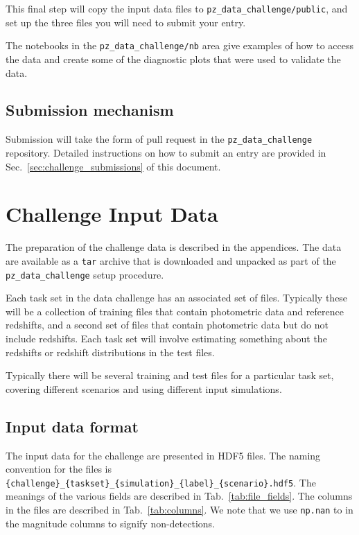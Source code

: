 \documentclass[11pt,twoside,letterpaper,onecolumn,english]{article}
\begin{document}
This final step will copy the input data files to
\texttt{pz\_data\_challenge/public}, and set up the three files you will
need to submit your entry.

The notebooks in the \texttt{pz\_data\_challenge/nb} area give examples
of how to access the data and create some of the diagnostic plots
that were used to validate the data.


\subsection{Submission mechanism}

Submission will take the form of pull request in the
\texttt{pz\_data\_challenge} repository.  Detailed instructions on how
to submit an entry are provided in
Sec.~\ref{sec:challenge_submissions} of this document.


\section{Challenge Input Data}
\label{sec:challenge_input_data}

The preparation of the challenge data is described in the appendices.
The data are available as a \texttt{tar} archive that is downloaded and
unpacked as part of the \texttt{pz\_data\_challenge} setup procedure.

Each task set in the data challenge has an associated set of files.
Typically these will be a collection of training files that contain
photometric data and reference redshifts, and a second set of files
that contain photometric data but do not include redshifts. Each
task set will involve estimating something about the redshifts or
redshift distributions in the test files.

Typically there will be several training and test files for a
particular task set, covering different scenarios and using different
input simulations.


\subsection{Input data format}

The input data for the challenge are presented in HDF5 files.
The naming convention for the files is
\texttt{\{challenge\}\_\{taskset\}\_\{simulation\}\_\{label\}\_\{scenario\}.hdf5}.
The meanings of the various \allowbreak fields are described in
Tab.~\ref{tab:file_fields}. The columns in the files are described
in Tab.~\ref{tab:columns}.  We note that we use \texttt{np.nan} to in
the magnitude columns to signify non-detections.
\end{document}
